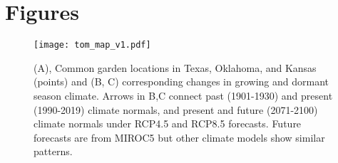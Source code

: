 \documentclass[9pt,twocolumn,twoside,lineno]{pnas-new}
\begin{document}

\showacknow{} %



\clearpage
\onecolumn
\section*{Figures}
\begin{figure}[H]
\centering
\texttt{[image: tom\_map\_v1.pdf]}
\caption{(A), Common garden locations in Texas, Oklahoma, and Kansas (points) and (B, C) corresponding changes in growing and dormant season climate. Arrows in B,C connect past (1901-1930) and present (1990-2019) climate normals, and present and future (2071-2100) climate normals under RCP4.5 and RCP8.5 forecasts. Future forecasts are from MIROC5 but other climate models show similar patterns.
			}
\label{fig:study_design}
\end{figure}
\clearpage
\end{document}
